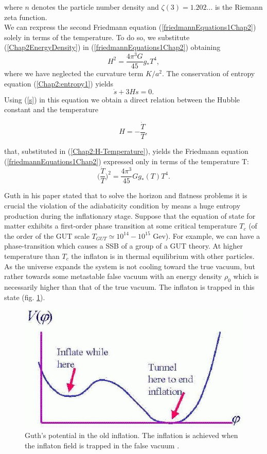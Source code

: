 \documentclass[11pt,a4paper,twoside]{book}
\begin{document}
where $ n $ denotes the particle number density and $\zeta(3)=1.202...$ is the Riemann zeta function.\\
We can rexpress the second Friedmann equation (\ref{friedmannEquations1Chap2}) solely in terms of the temperature. To do so, we substitute (\ref{Chap2EnergyDensity}) in (\ref{friedmannEquations1Chap2})  obtaining
\begin{equation}
	\label{Chap2:H-Temperature}
	H^{2}=\frac{4\pi^{3}G}{45}g_{*}T^{4},
\end{equation}
where we have neglected  the curvature term $ K/a^{2} $.
The conservation of entropy equation (\ref{Chap2:entropy1}) yields
\begin{equation}
	\label{Chap2entropy2}
	\dot{s} + 3Hs=0.
\end{equation}
Using  (\ref{s}) in this equation we obtain a direct relation between the Hubble constant and the temperature 

\begin{equation}
	\label{Chap2:relationTemperatureEntropy}
	H=-\frac{\dot{T}}{T},
\end{equation}

that, substituted in (\ref{Chap2:H-Temperature}), yields the Friedmann equation (\ref{friedmannEquations1Chap2}) expressed only in terms of the temperature T: 
\begin{equation}
	\label{Chap2:Friedmann-Temperature}
	\Big(\frac{\dot{T}}{T}\Big)^{2}=\frac{4\pi^{3}}{45}Gg_{*}(T)T^{4}.
\end{equation}

Guth in his paper stated that to solve the horizon and flatness problems it is crucial the violation of the adiabaticity condition by means a huge entropy production during the inflationary stage.
Suppose that the equation of state for matter exhibits a first-order phase transition at some critical temperature $ T_{c} $ (of the order of the GUT scale $T_{GUT}\simeq 10^{14}-10^{15}$ Gev). For example, we can have a phase-transition which causes a SSB of a group of a GUT theory. At higher temperature than $ T_{c} $ the inflaton is in thermal equilibrium with other particles.
As the universe expands the system is not cooling toward the true vacuum, but rather towards some metastable false vacuum with an energy density $ \rho_{0} $ which is necessarily higher than that of the true vacuum. The inflaton is trapped in this state (fig. \ref{fig:guthinflationfig5}).

\begin{figure}
	\centering
	\includegraphics[width=0.5\linewidth, height=0.24\textheight]{Images/Chap2/GuthInflation_Fig5}
	\caption{Guth's potential in the old inflation. The inflation is achieved when the inflaton field is trapped in the false vacuum \cite{Chap2:Fig1}. }
	\label{fig:guthinflationfig5}
\end{figure}
\end{document}
